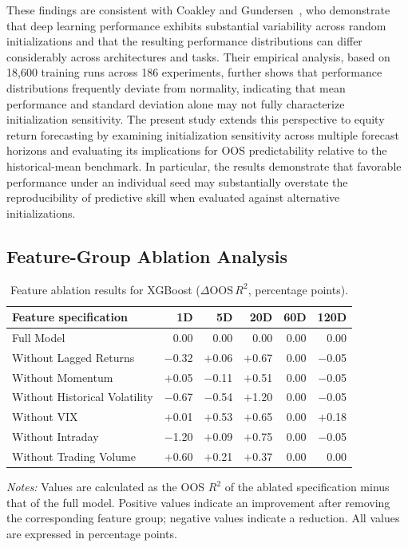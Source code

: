 \documentclass[runningheads,orivec]{llncs}
\begin{document}
These findings are consistent with Coakley and Gundersen~\cite{coakley2026}, who demonstrate that deep learning performance exhibits substantial variability across random initializations and that the resulting performance distributions can differ considerably across architectures and tasks. Their empirical analysis, based on 18,600 training runs across 186 experiments, further shows that performance distributions frequently deviate from normality, indicating that mean performance and standard deviation alone may not fully characterize initialization sensitivity. The present study extends this perspective to equity return forecasting by examining initialization sensitivity across multiple forecast horizons and evaluating its implications for OOS predictability relative to the historical-mean benchmark. In particular, the results demonstrate that favorable performance under an individual seed may substantially overstate the reproducibility of predictive skill when evaluated against alternative initializations.

\subsection{Feature-Group Ablation Analysis}\label{subsec:ablation_study}

\begin{table}[htbp]
\centering
\caption{Feature ablation results for XGBoost ($\Delta \mathrm{OOS}\,R^2$, percentage points).}\label{tab:ablation_xgboost}
{\footnotesize
\setlength{\tabcolsep}{6pt}
\begin{tabular}{lrrrrr}
\hline
Feature specification & 1D & 5D & 20D & 60D & 120D \\
\hline
Full Model & 0.00 & 0.00 & 0.00 & 0.00 & 0.00 \\
Without Lagged Returns & $-$0.32 & $+$0.06 & $+$0.67 & 0.00 & $-$0.05 \\
Without Momentum & $+$0.05 & $-$0.11 & $+$0.51 & 0.00 & $-$0.05 \\
Without Historical Volatility & $-$0.67 & $-$0.54 & $+$1.20 & 0.00 & $-$0.05 \\
Without VIX & $+$0.01 & $+$0.53 & $+$0.65 & 0.00 & $+$0.18 \\
Without Intraday & $-$1.20 & $+$0.09 & $+$0.75 & 0.00 & $-$0.05 \\
Without Trading Volume & $+$0.60 & $+$0.21 & $+$0.37 & 0.00 & 0.00 \\
\hline
\end{tabular}
}
\par\vspace{4pt}\parbox{\linewidth}{\scriptsize\textit{Notes:} Values are calculated as the OOS $R^2$ of the ablated specification minus that of the full model. Positive values indicate an improvement after removing the corresponding feature group; negative values indicate a reduction. All values are expressed in percentage points.}
\end{table}
\end{document}
